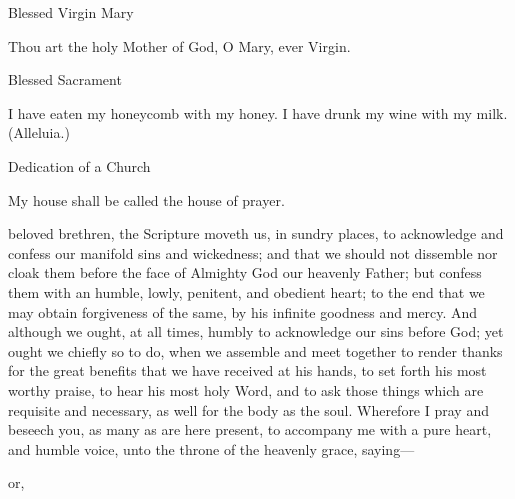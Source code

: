 \begin{multicols}{2}
\begin{inhead}
Blessed Virgin Mary
\end{inhead}\noindent
Thou art the holy Mother of God, O Mary, ever Virgin.

\begin{inhead}
Blessed Sacrament
\end{inhead}\noindent
I have eaten my honeycomb with my honey. I have drunk my wine with my milk. (Alleluia.)

\begin{inhead}
Dedication of a Church
\end{inhead}\noindent
	My house shall be called the house of prayer.
\end{multicols}
 beloved brethren, the Scripture moveth us, in sundry places, to acknowledge and confess our manifold sins and wickedness; and that we should not dissemble nor cloak them before the face of Almighty God our heavenly Father; but confess them with an humble, lowly, penitent, and obedient heart; to the end that we may obtain forgiveness of the same, by his infinite goodness and mercy. And although we ought, at all times, humbly to acknowledge our sins before God; yet ought we chiefly so to do, when we assemble and meet together to render thanks for the great benefits that we have received at his hands, to set forth his most worthy praise, to hear his most holy Word, and to ask those things which are requisite and necessary, as well for the body as the soul. Wherefore I pray and beseech you, as many as are here present, to accompany me with a pure heart, and humble voice, unto the throne of the heavenly grace, saying---
\begin{inhead}
    or,
\end{inhead}
\par%
\noindent%
